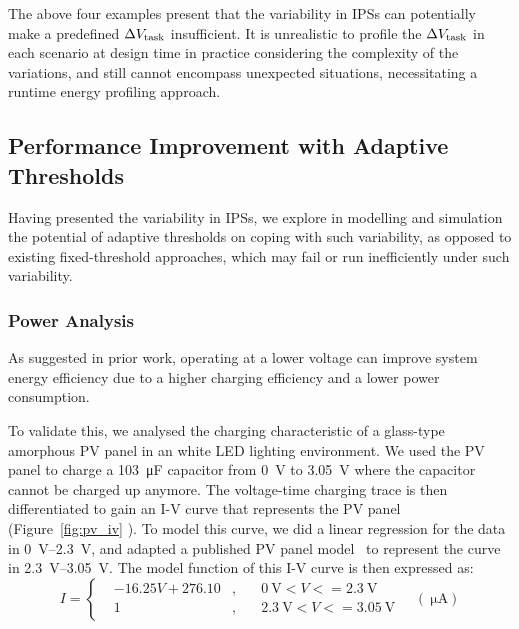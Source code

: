 The above four examples present that the variability in IPSs can potentially make a predefined $\Delta V_{\text{task}}$ insufficient. 
It is unrealistic to profile the $\Delta V_{\text{task}}$ in each scenario at design time in practice considering the complexity of the variations, and still cannot encompass unexpected situations, necessitating a runtime energy profiling approach. 


\subsection{Performance Improvement with Adaptive Thresholds}

Having presented the variability in IPSs, we explore in modelling and simulation the potential of adaptive thresholds on coping with such variability, as opposed to existing fixed-threshold approaches, which may fail or run inefficiently under such variability.


\subsubsection{Power Analysis}

As suggested in prior work, operating at a lower voltage can improve system energy efficiency due to a higher charging efficiency and a lower power consumption.

To validate this, we analysed the charging characteristic of a glass-type amorphous PV panel in an white LED lighting environment. 
We used the PV panel to charge a \SI{103}{\micro\farad} capacitor from \SI{0}{\volt} to \SI{3.05}{\volt} where the capacitor cannot be charged up anymore. 
The voltage-time charging trace is then differentiated to gain an I-V curve that represents the PV panel (Figure~\ref{fig:pv_iv} ). 
To model this curve, we did a linear regression for the data in \SIrange{0}{2.3}{\volt}, and adapted a published PV panel model~\cite{en9050326} to represent the curve in \SIrange{2.3}{3.05}{\volt}.
The model function of this I-V curve is then expressed as:
\begin{equation}
    I = \left\{
    \begin{aligned}
        & -16.25 V + 276.10 & , & \quad \SI{0}{\volt} < V <= \SI{2.3}{\volt} \\
        & 1 & , & \quad \SI{2.3}{\volt} < V <= \SI{3.05}{\volt}
    \end{aligned}
    \right. 
    \quad (\SI{}{\micro\ampere})
    \label{eq:pv_iv}
\end{equation}

